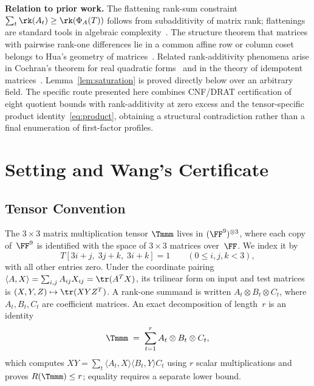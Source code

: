 \documentclass[11pt,a4paper]{article}
\begin{document}
\noindent\textbf{Relation to prior work.}\quad
The flattening rank-sum constraint $\sum_t\rk(A_t)\ge\rk(\Phi_A(T))$ follows from subadditivity of matrix rank; flattenings are standard tools in algebraic complexity~\cite{burgisser1997algebraic,blaser1999focs}. The structure theorem that matrices with pairwise rank-one differences lie in a common affine row or column coset belongs to Hua's geometry of matrices~\cite{hua1945geometries,wan1996geometry,pazzis2015hua}. Related rank-additivity phenomena arise in Cochran's theorem for real quadratic forms~\cite{cochran1934distribution} and in the theory of idempotent matrices~\cite{tian2001rank}. Lemma~\ref{lem:saturation} is proved directly below over an arbitrary field. The specific route presented here combines CNF/DRAT certification of eight quotient bounds with rank-additivity at zero excess and the tensor-specific product identity~\eqref{eq:product}, obtaining a structural contradiction rather than a final enumeration of first-factor profiles.




\section{Setting and Wang's Certificate}\label{sec:setting}

\subsection{Tensor Convention}

The $3\times 3$ matrix multiplication tensor $\Tmmm$ lives in $(\FF^9)^{\otimes 3}$, where each copy of~$\FF^9$ is identified with the space of $3\times 3$ matrices over~$\FF$.  We index it by
\begin{equation}\label{eq:tensor}
  T[3i+j,\;3j+k,\;3i+k] = 1 \qquad (0\le i,j,k<3),
\end{equation}
with all other entries zero. Under the coordinate pairing
$\langle A,X\rangle=\sum_{i,j}A_{ij}X_{ij}=\tr(A^TX)$, its trilinear
form on input and test matrices is $(X,Y,Z)\mapsto\tr(XYZ^T)$.
A rank-one summand is written $A_t\otimes B_t\otimes C_t$, where
$A_t,B_t,C_t$ are coefficient matrices. An exact decomposition of length~$r$ is an identity
\begin{equation}\label{eq:general-decomposition}
  \Tmmm \;=\; \sum_{t=1}^r A_t\otimes B_t\otimes C_t,
\end{equation}
which computes $XY=\sum_t\langle A_t,X\rangle\langle B_t,Y\rangle C_t$
using $r$ scalar multiplications and proves $R(\Tmmm)\le r$; equality
requires a separate lower bound.
\end{document}
